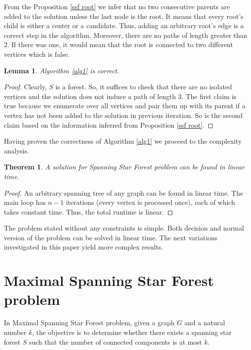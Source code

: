 \documentclass[en]{pracamgr}
\newtheorem{theorem}{Theorem}
\newtheorem{lemma}{Lemma}
\newcommand{\ssf}{spanning star forest}
\newcommand{\ssfp}{{\sc Spanning Star Forest} problem}
\newcommand{\mssfp}{{\sc Maximal Spanning Star Forest} problem}
\begin{document}
From the Proposition \ref{ssf root} we infer that no two consecutive parents are added to the solution unless the last node is the root. It means that every root's child is either a center or a candidate. Thus, adding an arbitrary root's edge is a correct step in the algorithm. Moreover, there are no paths of length greater than $2$. If there was one, it would mean that the root is connected to two different vertices which is false.

\begin{lemma}\label{alg1 correctness}
	Algorithm \ref{alg1} is correct.
\end{lemma}

\begin{proof}
	Clearly, $S$ is a forest. So, it suffices to check that there are no isolated vertices and the solution does not induce a path of length $3$. The first claim is true because we enumerate over all vertices and pair them up with its parent if a vertex has not been added to the solution in previous iteration. So is the second claim based on the information inferred from Proposition \ref{ssf root}.
\end{proof}

Having proven the correctness of Algorithm \ref{alg1} we proceed to the complexity analysis.

\begin{theorem}
	A solution for \ssfp{} can be found in linear time.
\end{theorem}

\begin{proof}
	An arbitrary spanning tree of any graph can be found in linear time. The main loop has $n-1$ iterations (every vertex is processed once), each of which takes constant time.
	Thus, the total runtime is linear.
\end{proof}

The problem stated without any constraints is simple. Both decision and normal version of the problem can be solved in linear time. The next variations investigated in this paper yield more complex results.

\section{Maximal Spanning Star Forest problem}

In \mssfp{}, given a graph $G$ and a natural number $k$, the objective is to determine whether there exists a \ssf{} $S$ such that the number of connected components is at most $k$.
\end{document}
